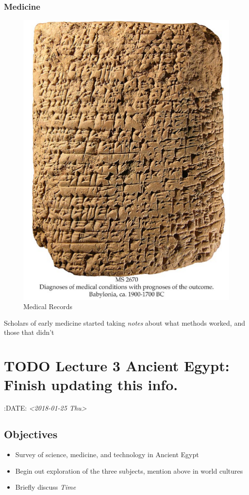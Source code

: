 \documentclass[11pt]{article}
\begin{document}
\subsubsection{Medicine}
\label{sec-3-8-6}
\begin{figure}[htb]
\centering
\includegraphics[width=.9\linewidth]{./img/MedRecs.png}
\caption{Medical Records}
\end{figure}

Scholars of early medicine started taking \emph{notes} about what methods worked, and those that didn't


\section{{\bfseries\sffamily TODO} Lecture 3 Ancient Egypt: Finish updating this info.}
\label{sec-4}
:DATE: \textit{<2018-01-25 Thu>}

\subsection{Objectives}
\label{sec-4-1}
\begin{itemize}
\item Survey of science, medicine, and technology in Ancient Egypt

\item Begin out exploration of the three subjects, mention above in world cultures

\item Briefly discuss \emph{Time}
\end{itemize}
\end{document}
